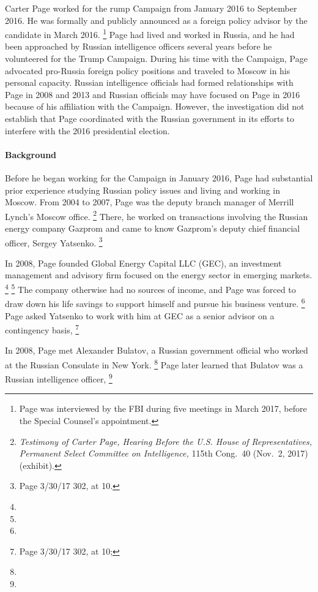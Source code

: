 Carter Page worked for the rump Campaign from January 2016 to September 2016.
He was formally and publicly announced as a foreign policy advisor by the candidate in March 2016.%
\footnote{Page was interviewed by the FBI during five meetings in March 2017, before the Special Counsel's appointment.
}
Page had lived and worked in Russia, and he had been approached by Russian intelligence officers several years before he volunteered for the Trump Campaign.
During his time with the Campaign, Page advocated pro-Russia foreign policy positions and traveled to Moscow in his personal capacity.
Russian intelligence officials had formed relationships with Page in 2008 and 2013 and Russian officials may have focused on Page in 2016 because of his affiliation with the Campaign.
However, the investigation did not establish that Page coordinated with the Russian government in its efforts to interfere with the 2016 presidential election.

\paragraph{Background}

Before he began working for the Campaign in January 2016, Page had substantial prior experience studying Russian policy issues and living and working in Moscow.
From 2004 to 2007, Page was the deputy branch manager of Merrill Lynch's Moscow office.%
\footnote{\textit{Testimony of Carter Page, Hearing Before the U.S. House of Representatives, Permanent Select Committee on Intelligence,} 115th Cong.~40 (Nov.~2, 2017) (exhibit).}
There, he worked on transactions involving the Russian energy company Gazprom and came to know Gazprom's deputy chief financial officer, Sergey Yatsenko.%
\footnote{Page 3/30/17 302, at 10.}

In 2008, Page founded Global Energy Capital LLC (GEC), an investment management and advisory firm focused on the energy sector in emerging markets.%
\footnote{}
\footnote{}
The company otherwise had no sources of income, and Page was forced to draw down his life savings to support himself and pursue his business venture.%
\footnote{}
Page asked Yatsenko to work with him at GEC as a senior advisor on a contingency basis,
\footnote{Page 3/30/17 302, at 10; }

In 2008, Page met Alexander Bulatov, a Russian government official who worked at the Russian Consulate in New York.%
\footnote{}
Page later learned that Bulatov was a Russian intelligence officer,
\footnote{}

